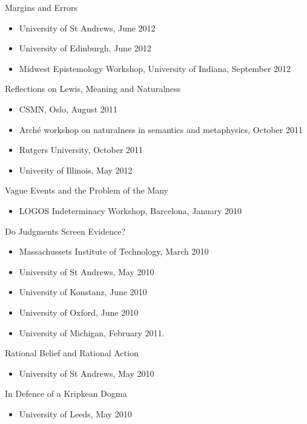 \documentclass[
  10pt,
  letterpaper,
  DIV=11,
  numbers=noendperiod,
  twoside]{scrartcl}
\providecommand{\tightlist}{%
  \setlength{\itemsep}{0pt}\setlength{\parskip}{0pt}}\usepackage{longtable,booktabs,array}
\begin{document}
Margins and Errors

\begin{itemize}
\tightlist
\item
  University of St Andrews, June 2012
\item
  University of Edinburgh, June 2012
\item
  Midwest Epistemology Workshop, University of Indiana, September 2012
\end{itemize}

Reflections on Lewis, Meaning and Naturalness

\begin{itemize}
\tightlist
\item
  CSMN, Oslo, August 2011
\item
  Arché workshop on naturalness in semantics and metaphysics, October
  2011
\item
  Rutgers University, October 2011
\item
  Univerity of Illinois, May 2012
\end{itemize}

Vague Events and the Problem of the Many

\begin{itemize}
\tightlist
\item
  LOGOS Indeterminacy Workshop, Barcelona, January 2010
\end{itemize}

Do Judgments Screen Evidence?

\begin{itemize}
\tightlist
\item
  Massachussets Institute of Technology, March 2010
\item
  University of St Andrews, May 2010
\item
  University of Konstanz, June 2010
\item
  University of Oxford, June 2010
\item
  University of Michigan, February 2011.
\end{itemize}

Rational Belief and Rational Action

\begin{itemize}
\tightlist
\item
  University of St Andrews, May 2010
\end{itemize}

In Defence of a Kripkean Dogma

\begin{itemize}
\tightlist
\item
  University of Leeds, May 2010
\end{itemize}
\end{document}
